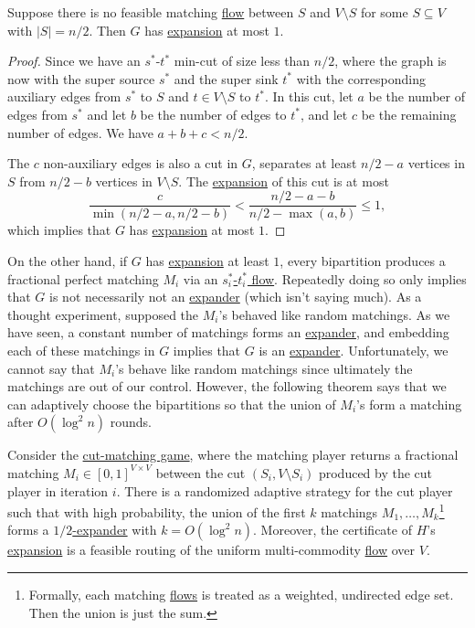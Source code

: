 \begin{lemma}\label{lma:cut-matching-fail}
	Suppose there is no feasible matching \hyperref[def:flow]{flow} between \(S\) and \(V\setminus S\) for some \(S \subseteq V\) with \(\lvert S \rvert = n / 2\). Then \(G\) has \hyperref[def:expansion]{expansion} at most \(1\).
\end{lemma}
\begin{proof}
	Since we have an \(s^{\ast}\)-\(t^{\ast} \) min-cut of size less than \(n / 2\), where the graph is now with the super source \(s^{\ast} \) and the super sink \(t^{\ast} \) with the corresponding auxiliary edges from \(s^{\ast} \) to \(S\) and \(t \in V\setminus S\) to \(t^{\ast} \). In this cut, let \(a\) be the number of edges from \(s^{\ast} \) and let \(b\) be the number of edges to \(t^{\ast} \), and let \(c\) be the remaining number of edges. We have \(a + b + c < n / 2\).

	The \(c\) non-auxiliary edges is also a cut in \(G\), separates at least \(n / 2 - a\) vertices in \(S\) from \(n / 2 - b\) vertices in \(V\setminus S\). The \hyperref[def:expansion]{expansion} of this cut is at most
	\[
		\frac{c}{\min (n / 2 - a, n / 2 - b)}
		< \frac{n / 2 - a - b}{n / 2 - \max (a, b)}
		\leq 1,
	\]
	which implies that \(G\) has \hyperref[def:expansion]{expansion} at most \(1\).
\end{proof}

On the other hand, if \(G\) has \hyperref[def:expansion]{expansion} at least \(1\), every bipartition produces a fractional perfect matching \(M_i\) via an \hyperref[prb:s-t-max-flow]{\(s^{\ast} _i\)-\(t^{\ast} _i\) flow}. Repeatedly doing so only implies that \(G\) is not necessarily not an \hyperref[def:expander]{expander} (which isn't saying much). As a thought experiment, supposed the \(M_i\)'s behaved like random matchings. As we have seen, a constant number of matchings forms an \hyperref[def:expander]{expander}, and embedding each of these matchings in \(G\) implies that \(G\) is an \hyperref[def:expander]{expander}. Unfortunately, we cannot say that \(M_i\)'s behave like random matchings since ultimately the matchings are out of our control. However, the following theorem says that we can adaptively choose the bipartitions so that the union of \(M_i\)'s form a matching after \(O(\log ^2 n)\) rounds.

\begin{theorem}\label{thm:cut-matching-succeed}
	Consider the \hyperref[def:cut-matching-game]{cut-matching game}, where the matching player returns a fractional matching \(M_i \in [0, 1]^{V \times V}\) between the cut \((S_i, V\setminus S_i)\) produced by the cut player in iteration \(i\). There is a randomized adaptive strategy for the cut player such that with high probability, the union of the first \(k\) matchings \(M_1, \dots , M_k\)\footnote{Formally, each matching \hyperref[def:flow]{flows} is treated as a weighted, undirected edge set. Then the union is just the sum.} forms a \hyperref[def:expander]{\(1 / 2\)-expander} with \(k = O(\log ^2 n)\). Moreover, the certificate of \(H\)'s \hyperref[def:expansion]{expansion} is a feasible routing of the uniform multi-commodity \hyperref[def:flow]{flow} over \(V\).
\end{theorem}

